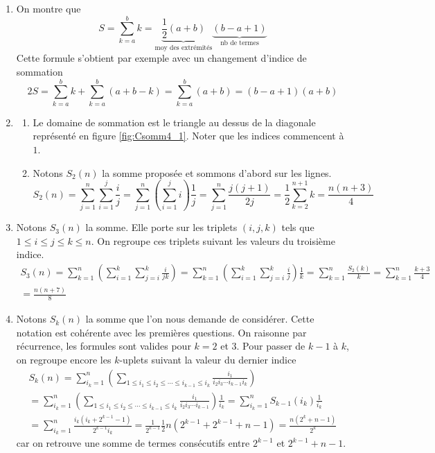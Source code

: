 \begin{enumerate}
  \item On montre que 
\begin{displaymath}
 S = \sum_{k=a}^b k = \underset{\text{moy des extrémités}}{\underbrace{\frac{1}{2}(a+b)}}
                   \underset{\text{nb de termes}}{\underbrace{(b-a+1)}}
\end{displaymath}
Cette formule s'obtient par exemple avec un changement d'indice de sommation
\begin{displaymath}
2S = \sum_{k=a}^b k + \sum_{k=a}^b (a+b-k) = \sum_{k=a}^b (a+b) = (b-a+1)(a+b)
\end{displaymath}

  \item 
\begin{enumerate}
  \item Le domaine de sommation est le triangle au dessus de la diagonale représenté en figure \ref{fig:Csomm4_1}. Noter que les indices commencent à $1$.
  \item Notons $S_2(n)$ la somme proposée et sommons d'abord sur les lignes.
\begin{displaymath}
S_2(n) = \sum_{j=1}^{n}\sum_{i=1}^{j}\frac{i}{j}
= \sum_{j=1}^{n}\left( \sum_{i=1}^{j}i\right)\frac{1}{j}
= \sum_{j=1}^{n}\frac{j(j+1)}{2j}
= \frac{1}{2}\sum_{k=2}^{n+1}k = \frac{n(n+3)}{4}
\end{displaymath}
\end{enumerate}

  \item Notons $S_3(n)$ la somme. Elle porte sur les triplets $(i,j,k)$ tels que $1\leq i \leq j \leq k \leq n$. On regroupe ces triplets suivant les valeurs du troisième indice.
\begin{multline*}
  S_3(n) = \sum_{k=1}^n\left( \sum_{i=1}^k \sum_{j=i}^k\frac{i}{jk}\right) 
= \sum_{k=1}^n\left( \sum_{i=1}^k \sum_{j=i}^k\frac{i}{j}\right)\frac{1}{k}
= \sum_{k=1}^n \frac{S_2(k)}{k}
= \sum_{k=1}^n \frac{k+3}{4} \\
=\frac{n(n+7)}{8}
\end{multline*}

  \item Notons $S_k(n)$ la somme que l'on nous demande de considérer. Cette notation est cohérente avec les premières questions. On raisonne par récurrence, les formules sont valides pour $k=2$ et $3$. Pour passer de $k-1$ à $k$, on regroupe encore les $k$-uplets suivant la valeur du dernier indice
\begin{multline*}
S_k(n) = \sum_{i_k=1}^{n}\left( \sum_{1\leq i_1 \leq i_2 \leq \cdots \leq i_{k-1}\leq i_{k}} \frac{i_1}{i_2 i_3 \cdots i_{k-1} i_k}\right) \\
= \sum_{i_k=1}^{n}\left( \sum_{1\leq i_1 \leq i_2 \leq \cdots \leq i_{k-1}\leq i_{k}} \frac{i_1}{i_2 i_3 \cdots i_{k-1}}\right)\frac{1}{i_k}
= \sum_{i_k=1}^{n} S_{k-1}(i_k)\frac{1}{i_k}\\
= \sum_{i_k=1}^{n}\frac{i_k(i_k+2^{k-1}-1)}{2^{k-1}i_k}
= \frac{1}{2^{k-1}}\frac{1}{2}n(2^{k-1}+2^{k-1}+n-1)
= \frac{n(2^{k}+n-1)}{2^{k}}
\end{multline*}
car on retrouve une somme de termes consécutifs entre $2^{k-1}$ et $2^{k-1}+n-1$.
\end{enumerate}
